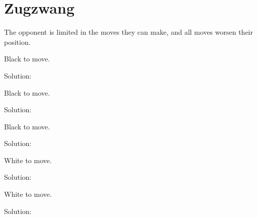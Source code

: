 \documentclass{book}
\begin{document}
\section{Zugzwang}
The opponent is limited in the moves they can make, and all moves worsen their position.\begin{multicols}{2} 
\begin{samepage} 
\newgame 


 
\showboard
 
 Black to move. 
 
Solution: 
 
\end{samepage}\begin{samepage} 
\newgame 


 
\showboard
 
 Black to move. 
 
Solution: 
 
\end{samepage}\begin{samepage} 
\newgame 


 
\showboard
 
 Black to move. 
 
Solution: 
 
\end{samepage}\begin{samepage} 
\newgame 


 
\showboard
 
 White to move. 
 
Solution: 
 
\end{samepage}\begin{samepage} 
\newgame 


 
\showboard
 
 White to move. 
 
Solution: 
 
\end{samepage}\end{multicols} 
 
\end{document}
